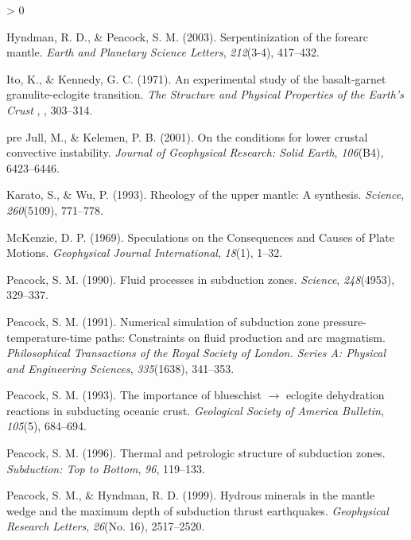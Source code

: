 \documentclass[draft,linenumbers]{agujournal2018}
\newlength{\cslhangindent}
\newenvironment{CSLReferences}[2] %
 {%
  \setlength{\parindent}{0pt}
  \ifodd #1 \everypar{\setlength{\hangindent}{\cslhangindent}}\ignorespaces\fi
  \ifnum #2 > 0
  \setlength{\parskip}{#2\baselineskip}
  \fi
 }%
 {}
\providecommand{\DIFaddtex}[1]{{\protect\color{blue} \sf #1}} %
\providecommand{\DIFaddbegin}{} %
\providecommand{\DIFaddend}{} %
\providecommand{\DIFadd}[1]{\texorpdfstring{\DIFaddtex{#1}}{#1}} %
\begin{document}
\begin{CSLReferences}{1}{0}
\leavevmode{}%
Hyndman, R. D., \& Peacock, S. M. (2003). Serpentinization of the
forearc mantle. \emph{Earth and Planetary Science Letters},
\emph{212}(3-4), 417--432.

\leavevmode\vadjust pre{\DIFaddbegin \hypertarget{ref-Ito1971}{}}%
\DIFadd{Ito, K., \& Kennedy, G. C. (1971). An experimental study of the
basalt-garnet granulite-eclogite transition. }\emph{\DIFadd{The Structure and
Physical Properties of the Earth's Crust}}\DIFadd{, }\emph{\DIFadd{14}}\DIFadd{, 303--314.
}

\leavevmode\vadjust \DIFadd{pre}{\DIFaddend \hypertarget{ref-Jull2001}{}}%
Jull, M., \& Kelemen, P. B. (2001). On the conditions for lower crustal
convective instability. \emph{Journal of Geophysical Research: Solid
Earth}, \emph{106}(B4), 6423--6446.

\leavevmode{}%
Karato, S., \& Wu, P. (1993). Rheology of the upper mantle: A synthesis.
\emph{Science}, \emph{260}(5109), 771--778.

\leavevmode{}%
McKenzie, D. P. (1969). {Speculations on the Consequences and Causes of
Plate Motions}. \emph{Geophysical Journal International}, \emph{18}(1),
1--32.

\leavevmode{}%
Peacock, S. M. (1990). Fluid processes in subduction zones.
\emph{Science}, \emph{248}(4953), 329--337.

\leavevmode{}%
Peacock, S. M. (1991). Numerical simulation of subduction zone
pressure-temperature-time paths: Constraints on fluid production and arc
magmatism. \emph{Philosophical Transactions of the Royal Society of
London. Series A: Physical and Engineering Sciences}, \emph{335}(1638),
341--353.

\leavevmode{}%
Peacock, S. M. (1993). The importance of blueschist \(\rightarrow\)
eclogite dehydration reactions in subducting oceanic crust.
\emph{Geological Society of America Bulletin}, \emph{105}(5), 684--694.

\leavevmode{}%
Peacock, S. M. (1996). Thermal and petrologic structure of subduction
zones. \emph{Subduction: Top to Bottom}, \emph{96}, 119--133.

\leavevmode{}%
Peacock, S. M., \& Hyndman, R. D. (1999). {Hydrous minerals in the
mantle wedge and the maximum depth of subduction thrust earthquakes}.
\emph{Geophysical Research Letters}, \emph{26}(No. 16), 2517--2520.


\end{CSLReferences}
\end{document}

